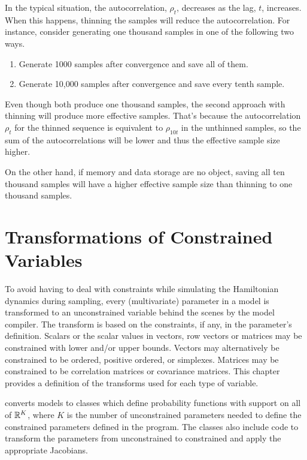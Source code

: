 In the typical situation, the autocorrelation, $\rho_t$, decreases as
the lag, $t$, increases.  When this happens, thinning the samples will
reduce the autocorrelation.  For instance, consider generating one
thousand samples in one of the following two ways.
%
\begin{enumerate}
\item Generate 1000 samples after convergence and save all of
  them.
\item Generate 10,000 samples after convergence and save every tenth
  sample.
\end{enumerate}
%
Even though both produce one thousand samples, the second approach
with thinning will produce more effective samples.  That's because the
autocorrelation $\rho_t$ for the thinned sequence is equivalent to
$\rho_{10t}$ in the unthinned samples, so the sum of the autocorrelations
will be lower and thus the effective sample size higher.  

On the other hand, if memory and data storage are no object, saving all
ten thousand samples will have a higher effective sample size than
thinning to one thousand samples.



\chapter{Transformations of Constrained Variables}\label{variable-transforms.chapter}

\noindent
To avoid having to deal with constraints while simulating the
Hamiltonian dynamics during sampling, every (multivariate) parameter
in a \Stan model is transformed to an unconstrained variable behind
the scenes by the model compiler.  The transform is based on the
constraints, if any, in the parameter's definition.  Scalars or the
scalar values in vectors, row vectors or matrices may be constrained
with lower and/or upper bounds.  Vectors may alternatively be
constrained to be ordered, positive ordered, or simplexes.  Matrices
may be constrained to be correlation matrices or covariance matrices.
This chapter provides a definition of the transforms used for each
type of variable.

\Stan converts models to \Cpp classes which define probability
functions with support on all of $\reals^K$, where $K$ is the number
of unconstrained parameters needed to define the constrained
parameters defined in the program.  The \Cpp classes also include
code to transform the parameters from unconstrained to constrained and
apply the appropriate Jacobians.


